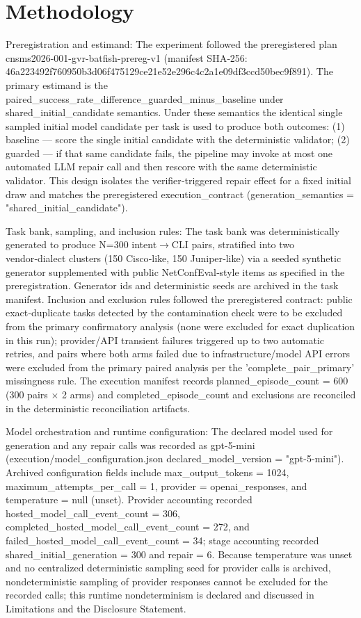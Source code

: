 \documentclass[conference]{IEEEtran}
\begin{document}
\section{Methodology}
Preregistration and estimand: The experiment followed the preregistered plan cnsms2026-001-gvr-batfish-prereg-v1 (manifest SHA‑256: 46a22349\allowbreak{}2f760950\allowbreak{}b3d06f47\allowbreak{}5129ce21\allowbreak{}e52e296c\allowbreak{}4c2a1e09\allowbreak{}df3ccd50\allowbreak{}bec9f891). The primary estimand is the paired\_success\_rate\_difference\_guarded\_minus\_baseline under shared\_initial\_candidate semantics. Under these semantics the identical single sampled initial model candidate per task is used to produce both outcomes: (1) baseline --- score the single initial candidate with the deterministic validator; (2) guarded --- if that same candidate fails, the pipeline may invoke at most one automated LLM repair call and then rescore with the same deterministic validator. This design isolates the verifier‑triggered repair effect for a fixed initial draw and matches the preregistered execution\_contract (generation\_semantics = "shared\_initial\_candidate").

Task bank, sampling, and inclusion rules: The task bank was deterministically generated to produce N=300 intent\ensuremath{\rightarrow}CLI pairs, stratified into two vendor‑dialect clusters (150 Cisco‑like, 150 Juniper‑like) via a seeded synthetic generator supplemented with public NetConfEval‑style items as specified in the preregistration. Generator ids and deterministic seeds are archived in the task manifest. Inclusion and exclusion rules followed the preregistered contract: public exact‑duplicate tasks detected by the contamination check were to be excluded from the primary confirmatory analysis (none were excluded for exact duplication in this run); provider/API transient failures triggered up to two automatic retries, and pairs where both arms failed due to infrastructure/model API errors were excluded from the primary paired analysis per the 'complete\_pair\_primary' missingness rule. The execution manifest records planned\_episode\_count = 600 (300 pairs \ensuremath{\times} 2 arms) and completed\_episode\_count and exclusions are reconciled in the deterministic reconciliation artifacts.

Model orchestration and runtime configuration: The declared model used for generation and any repair calls was recorded as gpt-5-mini (execution/model\_configuration.json declared\_model\_version = "gpt-5-mini"). Archived configuration fields include max\_output\_tokens = 1024, maximum\_attempts\_per\_call = 1, provider = openai\_responses, and temperature = null (unset). Provider accounting recorded hosted\_model\_call\_event\_count = 306, completed\_hosted\_model\_call\_event\_count = 272, and failed\_hosted\_model\_call\_event\_count = 34; stage accounting recorded shared\_initial\_generation = 300 and repair = 6. Because temperature was unset and no centralized deterministic sampling seed for provider calls is archived, nondeterministic sampling of provider responses cannot be excluded for the recorded calls; this runtime nondeterminism is declared and discussed in Limitations and the Disclosure Statement.
\end{document}
